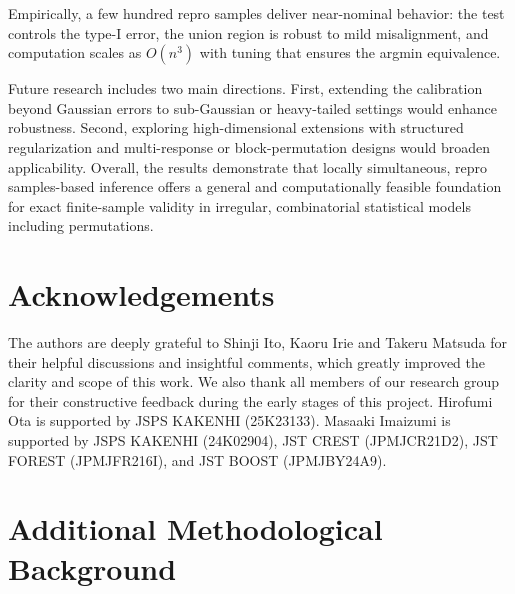 \documentclass[11pt, reqno]{amsart}
\newcommand{\1}{\mbox{1}\hspace{-0.25em}\mbox{l}}
\theoremstyle{definition}\newtheorem{problem}{Problem}[section]
\theoremstyle{definition}\newtheorem{definition}[problem]{Definition}
\theoremstyle{remark}\newtheorem{assumption}{Assumption}
\theoremstyle{remark}\newtheorem{remark}[problem]{Remark}
\theoremstyle{definition}\newtheorem{example}[problem]{Example}
\theoremstyle{plain}\newtheorem{theorem}[problem]{Theorem}
\theoremstyle{plain}\newtheorem{question}[problem]{Question}
\theoremstyle{plain}\newtheorem{lemma}[problem]{Lemma}
\theoremstyle{plain}\newtheorem{proposition}[problem]{Proposition}
\theoremstyle{plain}\newtheorem{corollary}[problem]{Corollary}
\theoremstyle{plain}\newtheorem{conjecture}[problem]{Conjecture}
\begin{document}
Empirically, a few hundred repro samples deliver near-nominal behavior: the test controls the type-I error, the union region is robust to mild misalignment, and computation scales as $O(n^3)$ with tuning that ensures the argmin equivalence.

Future research includes two main directions. First, extending the calibration beyond Gaussian errors to sub-Gaussian or heavy-tailed settings would enhance robustness. Second, exploring high-dimensional extensions with structured regularization and multi-response \cite{slawski2020two} or block-permutation designs \cite{abbasi2025alternating} would broaden applicability. Overall, the results demonstrate that locally simultaneous, repro samples-based inference offers a general and computationally feasible foundation for exact finite-sample validity in irregular, combinatorial statistical models including permutations.

\section*{Acknowledgements} 
The authors are deeply grateful to Shinji Ito, Kaoru Irie and Takeru Matsuda for their helpful discussions and insightful comments, which greatly improved the clarity and scope of this work. We also thank all members of our research group for their constructive feedback during the early stages of this project. Hirofumi Ota is supported by JSPS KAKENHI (25K23133). Masaaki Imaizumi is supported by JSPS KAKENHI (24K02904), JST CREST (JPMJCR21D2),  JST FOREST (JPMJFR216I), and JST BOOST (JPMJBY24A9).


\newpage
\appendix

\section{Additional Methodological Background}
\end{document}
